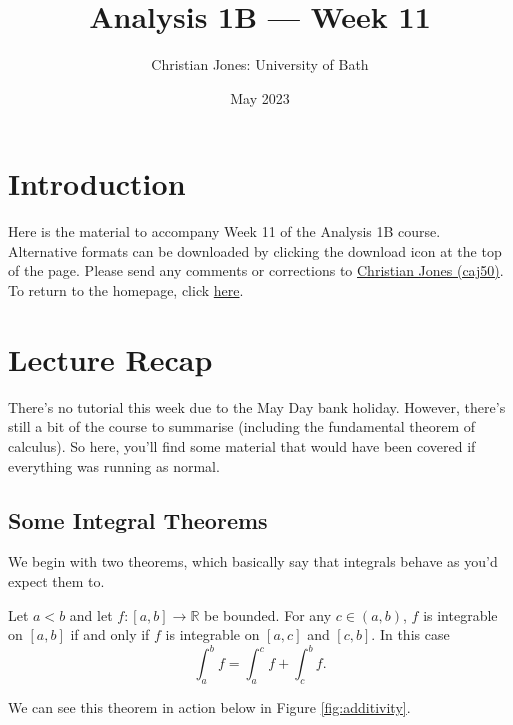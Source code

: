 \documentclass[
  10pt,
  a4paper]{article}
\title{Analysis 1B --- Week 11}
\author{Christian Jones: University of Bath}
\date{May 2023}
\theoremstyle{plain}
\theoremstyle{definition}
\theoremstyle{plain}
\theoremstyle{plain}
\theoremstyle{plain}
\theoremstyle{plain}
\theoremstyle{definition}
\theoremstyle{definition}
\theoremstyle{remark}
\theoremstyle{remark}
\let\BeginKnitrBlock\begin \let\EndKnitrBlock\end
\begin{document}
\maketitle

{
\setcounter{tocdepth}{2}
\tableofcontents
}
\newpage
{}

\hypertarget{introduction}{%
\section*{Introduction}\label{introduction}}

Here is the material to accompany Week 11 of the Analysis 1B course. Alternative formats can be downloaded by clicking the download icon at the top of the page. Please send any comments or corrections to \href{mailto:caj50@bath.ac.uk}{Christian Jones (caj50)}. To return to the homepage, click \href{http://caj50.github.io/tutoring.html}{here}.

\hypertarget{lecture-recap}{%
\section{Lecture Recap}\label{lecture-recap}}

There's no tutorial this week due to the May Day bank holiday. However, there's still a bit of the course to summarise (including the fundamental theorem of calculus). So here, you'll find some material that would have been covered if everything was running as normal.

\hypertarget{some-integral-theorems}{%
\subsection{Some Integral Theorems}\label{some-integral-theorems}}

We begin with two theorems, which basically say that integrals behave as you'd expect them to.

\BeginKnitrBlock{theorem}[Additivity of the Integral]
{\label{thm:thm1} }Let \(a<b\) and let \(f:[a,b] \to \mathbb{R}\) be bounded. For any \(c \in (a,b)\), \(f\) is integrable on \([a,b]\) if and only if \(f\) is integrable on \([a,c]\) and \([c,b].\) In this case \[\int_a^b f = \int_a^c f + \int_c^b f.\]
\EndKnitrBlock{theorem}

We can see this theorem in action below in Figure \ref{fig:additivity}.
\end{document}
